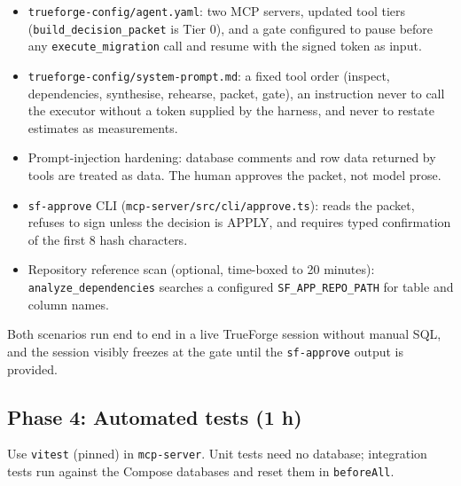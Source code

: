 \documentclass[11pt,a4paper]{article}
\newcommand{\fp}[1]{\nolinkurl{#1}}  %
\begin{document}
\begin{itemize}[leftmargin=*]
  \item \fp{trueforge-config/agent.yaml}: two MCP servers, updated tool tiers
        (\fp{build_decision_packet} is Tier 0), and a gate configured to pause before any
        \fp{execute_migration} call and resume with the signed token as input.
  \item \fp{trueforge-config/system-prompt.md}: a fixed tool order
        (inspect, dependencies, synthesise, rehearse, packet, gate), an
        instruction never to call the executor without a token supplied by the harness,
        and never to restate estimates as measurements.
  \item Prompt-injection hardening: database comments and row data returned by tools are
        treated as data. The human approves the packet, not model prose.
  \item \fp{sf-approve} CLI (\fp{mcp-server/src/cli/approve.ts}): reads the packet,
        refuses to sign unless the decision is APPLY, and requires typed confirmation of
        the first 8 hash characters.
  \item Repository reference scan (optional, time-boxed to 20 minutes): \fp{analyze_dependencies}
        searches a configured \fp{SF_APP_REPO_PATH} for table and column names.
\end{itemize}

\begin{acceptbox}
Both scenarios run end to end in a live TrueForge session without manual SQL, and the
session visibly freezes at the gate until the \fp{sf-approve} output is provided.
\end{acceptbox}

\subsection{Phase 4: Automated tests (1 h)}
\label{sec:p4}

Use \fp{vitest} (pinned) in \fp{mcp-server}. Unit tests need no database; integration
tests run against the Compose databases and reset them in \fp{beforeAll}.
\end{document}
